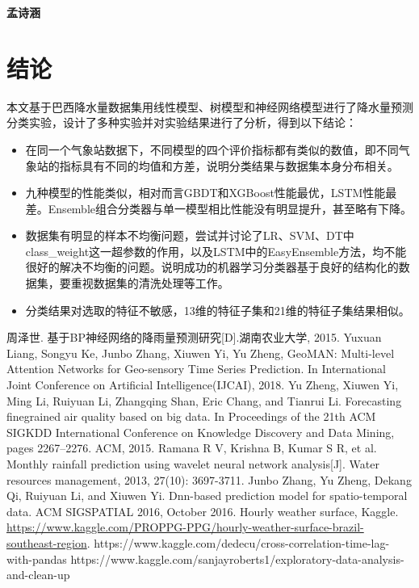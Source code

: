 \documentclass[UTF8]{ctexart}
\begin{document}
\textbf{孟诗涵}

\section{结论}
本文基于巴西降水量数据集用线性模型、树模型和神经网络模型进行了降水量预测分类实验，设计了多种实验并对实验结果进行了分析，得到以下结论：
\begin{itemize}
\item 在同一个气象站数据下，不同模型的四个评价指标都有类似的数值，即不同气象站的指标具有不同的均值和方差，说明分类结果与数据集本身分布相关。
\item 九种模型的性能类似，相对而言GBDT和XGBoost性能最优，LSTM性能最差。Ensemble组合分类器与单一模型相比性能没有明显提升，甚至略有下降。
\item 数据集有明显的样本不均衡问题，尝试并讨论了LR、SVM、DT中class\_weight这一超参数的作用，以及LSTM中的EasyEnsemble方法，均不能很好的解决不均衡的问题。说明成功的机器学习分类器基于良好的结构化的数据集，要重视数据集的清洗处理等工作。
\item 分类结果对选取的特征不敏感，13维的特征子集和21维的特征子集结果相似。
\end{itemize}

\begin{thebibliography}{20}
   周泽世. 基于BP神经网络的降雨量预测研究[D].湖南农业大学, 2015.
	 Yuxuan Liang, Songyu Ke, Junbo Zhang, Xiuwen Yi, Yu Zheng, GeoMAN: Multi-level Attention Networks
  for Geo-sensory Time Series Prediction. In International Joint Conference on Artificial Intelligence(IJCAI), 2018.
   Yu Zheng, Xiuwen Yi, Ming Li, Ruiyuan Li, Zhangqing Shan, Eric Chang, and Tianrui Li. Forecasting finegrained air quality based on big data. In Proceedings of the 21th ACM SIGKDD International Conference
  on Knowledge Discovery and Data Mining, pages 2267–2276. ACM, 2015.
   Ramana R V, Krishna B, Kumar S R, et al. Monthly rainfall prediction using wavelet neural network
  analysis[J]. Water resources management, 2013, 27(10): 3697-3711.
   Junbo Zhang, Yu Zheng, Dekang Qi, Ruiyuan Li, and Xiuwen Yi. Dnn-based prediction model
  for spatio-temporal data. ACM SIGSPATIAL 2016, October 2016.
   Hourly weather surface, Kaggle. \url{https://www.kaggle.com/PROPPG-PPG/hourly-weather-surface-brazil-southeast-region}.
   https://www.kaggle.com/dedecu/cross-correlation-time-lag-with-pandas
   https://www.kaggle.com/sanjayroberts1/exploratory-data-analysis-and-clean-up
\end{thebibliography}
\end{document}
